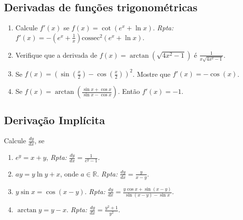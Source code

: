\documentclass[latin,20pt]{article}
\begin{document}
   \subsection{Derivadas de funções trigonométricas}
     \begin{enumerate}
     	\item Calcule $f'(x)$ se $f(x)=\cot (e^{x}+\ln x)$. 
     	{\it Rpta:} $f'(x)=-(e^{x}+\frac{1}{x})\text{cossec}^{2}(e^{x}+\ln x)$.
     	\item Verifique que a derivada de $f(x)=\arctan(\sqrt{4x^{2}-1})$
     	é $\frac{1}{x\sqrt{4x^{2}-1}}$.
     	\item Se $f(x)=\left(\sin(\frac{x}{2})-\cos(\frac{x}{2})\right)^{2}$.
     	Mostre que $f'(x)=-\cos (x)$.
     	\item Se $f(x)=\arctan(\frac{\sin x+\cos x}{\sin x-\cos x})$. Então
     	$f'(x)=-1$.
     \end{enumerate}
    \subsection{Derivação Implícita}   
   Calcule $\frac{dy}{dx}$, se  
    \begin{enumerate}
    \item $e^{y}=x+y$, {\it Rpta:} $\frac{dy}{dx}=\frac{1}{e^{y}-1}$.
    \item $ay=y\ln y+x$, onde $a \in \mathbb{R}$. 
    {\it Rpta:} $\frac{dy}{dx}=\frac{y}{x-y}$. 
    \item $y\sin x=\cos(x-y)$. {\it Rpta:} $\frac{dy}{dx}=\frac{y\cos x+\sin(x-y)}{\sin(x-y)-\sin x}$. 
    \item $\arctan y=y-x$. 
    {\it Rpta:} $\frac{dy}{dx}=\frac{y^2+1}{y^2}$. 
    \end{enumerate}
\end{document}
